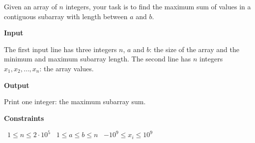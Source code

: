 Given an array of $n$ integers, your task is to find the maximum sum of values in a contiguous subarray with length between $a$ and $b$.

\vspace{0.3cm}\noindent\textbf{Input}

The first input line has three integers $n$, $a$ and $b$: the size of the array and the minimum and maximum subarray length.
The second line has $n$ integers $x_1,x_2,\dots,x_n$: the array values.

\vspace{0.3cm}\noindent\textbf{Output}

Print one integer: the maximum subarray sum.

\vspace{0.3cm}\noindent\textbf{Constraints}

\textbullet\ $1 \le n \le 2 \cdot 10^5$
\textbullet\ $1 \le a \le b \le n$
\textbullet\ $-10^9 \le x_i \le 10^9$